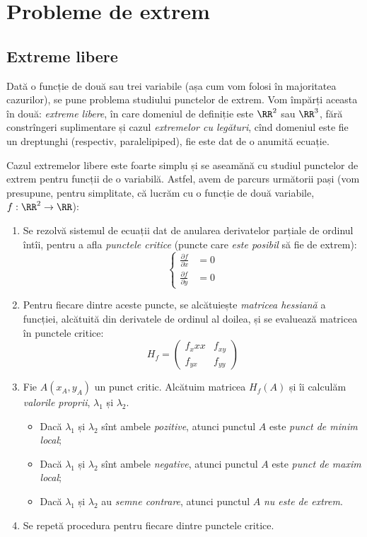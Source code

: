 \chapter{Probleme de extrem}

\section{Extreme libere}

Dată o funcție de două sau trei variabile (așa cum vom folosi în majoritatea
cazurilor), se pune problema studiului punctelor de extrem. Vom împărți
aceasta în două: \emph{extreme libere}, în care domeniul de definiție
este $ \RR^2 $ sau $ \RR^3 $, fără constrîngeri suplimentare și
cazul \emph{extremelor cu legături}, cînd domeniul este fie un
dreptunghi (respectiv, paralelipiped), fie este dat de o anumită ecuație.

Cazul extremelor libere este foarte simplu și se aseamănă cu studiul
punctelor de extrem pentru funcții de o variabilă. Astfel, avem
de parcurs următorii pași (vom presupune, pentru simplitate, că
lucrăm cu o funcție de două variabile, $ f : \RR^2 \to \RR $):
\begin{enumerate}[(1)]
\item Se rezolvă sistemul de ecuații dat de anularea derivatelor
  parțiale de ordinul întîi, pentru a afla \emph{punctele critice}
  (puncte care \emph{este posibil} să fie de extrem):
  \[
    \begin{cases}
      \frac{\partial f}{\partial x} &= 0 \\
      \frac{\partial f}{\partial y} &= 0
    \end{cases}
  \]
\item Pentru fiecare dintre aceste puncte, se alcătuiește \emph{matricea %
    hessiană} a funcției, alcătuită din derivatele de ordinul al doilea,
  și se evaluează matricea în punctele critice:
  \[
    H_f = \begin{pmatrix} f_x{xx} & f_{xy} \\ f_{yx} & f_{yy} \end{pmatrix}
  \]
\item Fie $ A(x_A, y_A) $ un punct critic. Alcătuim matricea $ H_f(A) $
  și îi calculăm \emph{valorile proprii}, $ \lambda_1 $ și $ \lambda_2 $.
  \begin{itemize}
  \item Dacă $ \lambda_1 $ și $ \lambda_2 $ sînt ambele \emph{pozitive}, atunci
    punctul $ A $ este \emph{punct de minim local};
  \item Dacă $ \lambda_1 $ și $ \lambda_2 $ sînt ambele \emph{negative}, atunci
    punctul $ A $ este \emph{punct de maxim local};
  \item Dacă $ \lambda_1 $ și $ \lambda_2 $ au \emph{semne contrare}, atunci
    punctul $ A $ \emph{nu este de extrem}.
  \end{itemize}
\item Se repetă procedura pentru fiecare dintre punctele critice.
\end{enumerate}

